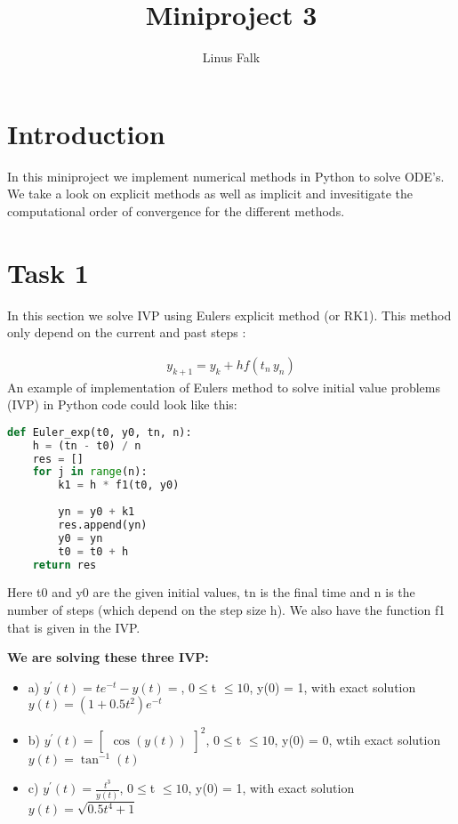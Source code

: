 \documentclass[a4paper]{article}
\title{Miniproject 3}
\author{Linus Falk}
\begin{document}
\maketitle
\section*{Introduction}
In this miniproject we implement numerical methods in Python to solve ODE's. We take a look on explicit methods as well as implicit and invesitigate the computational order of convergence for the different methods. 

\section*{Task 1}
In this section we solve IVP using Eulers explicit method (or RK1). This method only depend on the current and past steps \citep{euler}:

\begin{equation}
   \begin{aligned}
   y_{k+1} = y_{k} + hf(t_n\,y_n)
   \end{aligned}
 \end{equation}   
\newline 
An example of implementation of Eulers method to solve initial value problems (IVP) in Python code could look like this:
\newline
\begin{lstlisting}[language=Python]
def Euler_exp(t0, y0, tn, n):
    h = (tn - t0) / n
    res = []
    for j in range(n):
        k1 = h * f1(t0, y0)
        
        yn = y0 + k1
        res.append(yn)
        y0 = yn
        t0 = t0 + h
    return res
\end{lstlisting}

Here t0 and y0 are the given initial values, tn is the final time and n is the number of steps (which depend on the step size h). We also have the function f1 that is given in the IVP.

\newpage

\textbf{We are solving these three IVP:}
\begin{itemize}
	\item  a) $y^{\prime}(t) = te^{-t}-y(t) =$, $0\le$t $\le 10$, y(0) = 1, with exact solution $y(t) =(1+0.5t^{2})e^{-t}$	 
	\item b) $y^{\prime}(t) = \begin{bmatrix} \cos (y(t)) \end{bmatrix}^{2}$, $0\le$t $\le 10$, y(0) = 0, wtih exact solution $y(t) = \tan^{-1}(t)$

	\item c) $y^{\prime}(t) = \frac{t^3} {y(t)}$, $0\le$t $\le 10$, y(0) = 1, with exact solution $y(t) = \sqrt{0.5t^{4}+1}$
\end{itemize}
\end{document}
